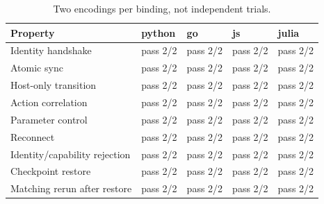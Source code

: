 \begin{table}[htbp]
\centering
\small
\caption{Two encodings per binding, not independent trials.}
\label{tab:conformance}
\begin{tabularx}{\linewidth}{>{\raggedright\arraybackslash}X>{\raggedright\arraybackslash}X>{\raggedright\arraybackslash}X>{\raggedright\arraybackslash}X>{\raggedright\arraybackslash}X}
\toprule
Property & python & go & js & julia \\
\midrule
Identity handshake & pass 2/2 & pass 2/2 & pass 2/2 & pass 2/2 \\
Atomic sync & pass 2/2 & pass 2/2 & pass 2/2 & pass 2/2 \\
Host-only transition & pass 2/2 & pass 2/2 & pass 2/2 & pass 2/2 \\
Action correlation & pass 2/2 & pass 2/2 & pass 2/2 & pass 2/2 \\
Parameter control & pass 2/2 & pass 2/2 & pass 2/2 & pass 2/2 \\
Reconnect & pass 2/2 & pass 2/2 & pass 2/2 & pass 2/2 \\
Identity/capability rejection & pass 2/2 & pass 2/2 & pass 2/2 & pass 2/2 \\
Checkpoint restore & pass 2/2 & pass 2/2 & pass 2/2 & pass 2/2 \\
Matching rerun after restore & pass 2/2 & pass 2/2 & pass 2/2 & pass 2/2 \\
\bottomrule
\end{tabularx}
\end{table}
